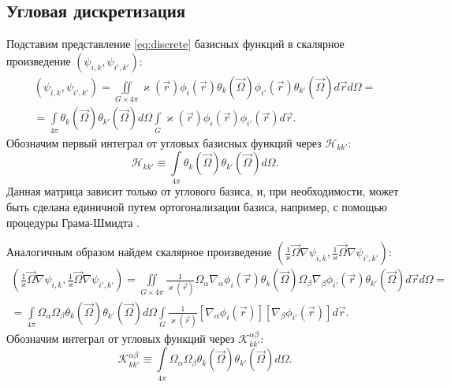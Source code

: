 \subsection{Угловая дискретизация}

Подставим представление \eqref{eq:discrete} базисных функций в скалярное произведение $(\psi_{i,k}, \psi_{i',k'})$:
\begin{multline*}
(\psi_{i,k}, \psi_{i',k'}) = \iint\limits_{G \times 4\pi} 
\varkappa(\vec r) \phi_i(\vec r) \theta_k(\vec \Omega)\phi_{i'}(\vec r)  \theta_{k'}(\vec \Omega) d\vec r d\Omega = \\ =
\int\limits_{4\pi} \theta_k(\vec \Omega) \theta_{k'}(\vec \Omega) d\Omega
\int\limits_G \varkappa(\vec r) \phi_i(\vec r) \phi_{i'}(\vec r) d\vec r.
\end{multline*}
Обозначим первый интеграл от угловых базисных функций через $\mathscr H_{kk'}$:
\[
\mathscr H_{kk'} \equiv \int\limits_{4\pi} \theta_k(\vec \Omega) \theta_{k'}(\vec \Omega) d\Omega.
\]
Данная матрица зависит только от углового базиса, и, при необходимости, может быть сделана единичной путем ортогонализации базиса, например, с помощью процедуры Грама-Шмидта \cite{beklemishev1998}.

Аналогичным образом найдем скалярное произведение $\left(\frac{1}{\varkappa} \vec\Omega\nabla \psi_{i,k}, \frac{1}{\varkappa}\vec\Omega\nabla\psi_{i',k'}\right)$:
\begin{multline*}
\left(\frac{1}{\varkappa} \vec\Omega\nabla \psi_{i,k}, \frac{1}{\varkappa}\vec\Omega\nabla\psi_{i',k'}\right) = \iint\limits_{G \times 4\pi} 
\frac{1}{\varkappa(\vec r)} \Omega_\alpha \nabla_\alpha\phi_i(\vec r) \theta_k(\vec \Omega) \Omega_\beta \nabla_\beta\phi_{i'}(\vec r)  \theta_{k'}(\vec \Omega) d\vec r d\Omega = \\ =
\int\limits_{4\pi} \Omega_\alpha \Omega_\beta\theta_k(\vec \Omega) \theta_{k'}(\vec \Omega) d\Omega
\int\limits_G \frac{1}{\varkappa(\vec r)} \left[\nabla_\alpha \phi_i(\vec r)\right] \left[\nabla_\beta \phi_{i'}(\vec r)\right] d\vec r.
\end{multline*}
Обозначим интеграл от угловых функций через $\mathscr{K}^{\alpha\beta}_{kk'}$:
\[
\mathscr{K}^{\alpha\beta}_{kk'} \equiv \int\limits_{4\pi} \Omega_\alpha \Omega_\beta \theta_k(\vec \Omega) \theta_{k'}(\vec \Omega) d\Omega.
\]

